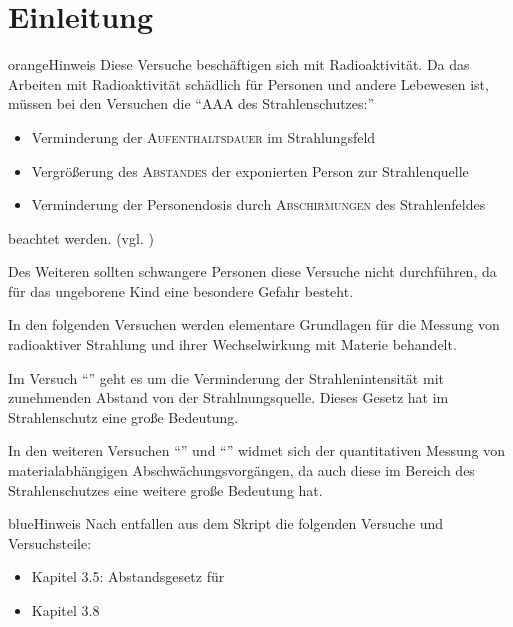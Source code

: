 \documentclass[../protokoll.tex]{subfiles}
\begin{document}
\part{Einleitung}
\begin{messageBox}{orange}{Hinweis}
Diese Versuche beschäftigen sich mit Radioaktivität. Da das Arbeiten mit
Radioaktivität schädlich für Personen und andere Lebewesen ist, müssen bei den
Versuchen die "`AAA des Strahlenschutzes:"'
\begin{itemize}
    \item Verminderung der \textsc{Aufenthaltsdauer} im Strahlungsfeld
    \item Vergrößerung des \textsc{Abstandes} der exponierten Person zur Strahlenquelle
    \item Verminderung der Personendosis durch \textsc{Abschirmungen} des Strahlenfeldes
\end{itemize}
beachtet werden. (vgl. \cite{AAA-Regel})

Des Weiteren sollten schwangere Personen diese Versuche nicht
durchführen, da für das ungeborene Kind eine besondere Gefahr besteht.
\end{messageBox}

In den folgenden Versuchen werden elementare Grundlagen für die Messung von
radioaktiver Strahlung und ihrer Wechselwirkung mit Materie behandelt.

Im Versuch "`"' geht es um die Verminderung der
Strahlenintensität mit zunehmenden Abstand von der Strahlnungsquelle. Dieses
Gesetz hat im Strahlenschutz eine große Bedeutung.

In den weiteren Versuchen "`"' und
"`"' widmet sich der quantitativen
Messung von materialabhängigen Abschwächungsvorgängen, da auch diese im Bereich
des Strahlenschutzes eine weitere große Bedeutung hat.

\begin{messageBox}{blue}{Hinweis}
    Nach \cite{listeEntfallendeVersuche} entfallen aus dem Skript die folgenden
    Versuche und Versuchsteile:
    \begin{itemize}
        \item Kapitel 3.5: Abstandsgesetz für 
        \item Kapitel 3.8
    \end{itemize}
\end{messageBox}
\end{document}
